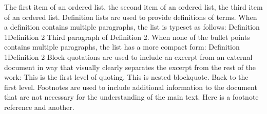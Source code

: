 {}\markdownRendererOlBeginTight
{}The first item of an ordered list,\markdownRendererOlItemEnd 
{}the second item of an ordered list,\markdownRendererOlItemEnd 
{}the third item of an ordered list.\markdownRendererOlItemEnd 
\markdownRendererOlEndTight \markdownRendererInterblockSeparator
{}Definition lists are used to provide definitions of terms. When a definition contains multiple paragraphs, the list is typeset as follows:\markdownRendererInterblockSeparator
{}\markdownRendererDlBegin
{}\markdownRendererDlDefinitionBegin Definition 1\markdownRendererDlDefinitionEnd \markdownRendererDlItemEnd {}\markdownRendererDlDefinitionBegin Definition 2\markdownRendererInterblockSeparator
{}\markdownRendererInterblockSeparator
{}Third paragraph of Definition 2.\markdownRendererDlDefinitionEnd \markdownRendererDlItemEnd 
\markdownRendererDlEnd\markdownRendererInterblockSeparator
{}When none of the bullet points contains multiple paragraphs, the list has a more compact form:\markdownRendererInterblockSeparator
{}\markdownRendererDlBeginTight
{}\markdownRendererDlDefinitionBegin Definition 1\markdownRendererDlDefinitionEnd \markdownRendererDlItemEnd {}\markdownRendererDlDefinitionBegin Definition 2\markdownRendererDlDefinitionEnd \markdownRendererDlItemEnd 
\markdownRendererDlEndTight\markdownRendererInterblockSeparator
{}Block quotations are used to include an excerpt from an external document in way that visually clearly separates the excerpt from the rest of the work:\markdownRendererInterblockSeparator
{}\markdownRendererBlockQuoteBegin
This is the first level of quoting.\markdownRendererInterblockSeparator
{}\markdownRendererBlockQuoteBegin
This is nested blockquote.
\markdownRendererBlockQuoteEnd \markdownRendererInterblockSeparator
{}Back to the first level.
\markdownRendererBlockQuoteEnd \markdownRendererInterblockSeparator
{}Footnotes are used to include additional information to the document that are not necessary for the understanding of the main text. Here is a footnote reference and another.\markdownRendererInterblockSeparator
